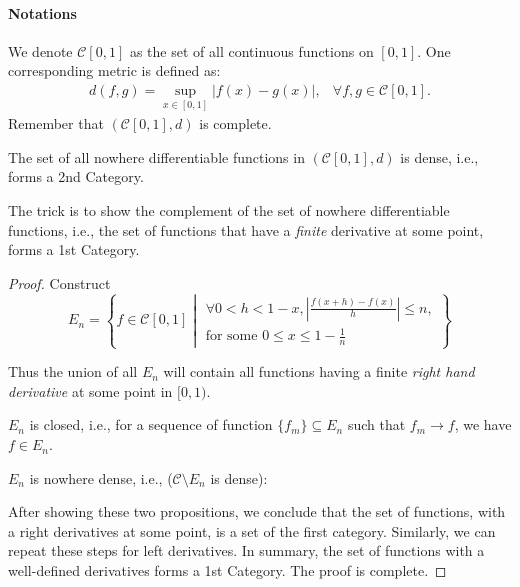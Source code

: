 \paragraph{Notations} We denote $\mathcal{C}[0,1]$ as the set of all continuous functions on $[0,1]$. One corresponding metric is defined as:
\[
\begin{array}{ll}
d(f,g) =\sup_{x\in[0,1]}|f(x) - g(x)|,
&
\forall f,g\in\mathcal{C}[0,1].
\end{array}
\]
Remember that $(\mathcal{C}[0,1],d)$ is complete.

\begin{theorem}
The set of all nowhere differentiable functions in $(\mathcal{C}[0,1],d)$ is dense, i.e., forms a 2nd Category.
\end{theorem}
The trick is to show the complement of the set of nowhere differentiable functions, i.e., the set of functions that have a \emph{finite} derivative at some point, forms a 1st Category.
\begin{proof}
Construct
\[
E_n=\left\{f\in\mathcal{C}[0,1]\middle|
\begin{aligned}
\forall 0<h<1-x,\left|\frac{f(x+h) - f(x)}{h}\right|\le n, \\
\mbox{for some $0\le x\le1-\frac{1}{n}$}
\end{aligned}
\right\}
\]

Thus the union of all $E_n$ will contain all functions having a finite \emph{right hand derivative} at some point in $[0,1).$
\begin{proposition}\label{Pro:4:3}
$E_n$ is closed, i.e., for a sequence of function $\{f_m\}\subseteq E_n$ such that $f_m\to f$, we have  $f\in E_n$.
\end{proposition}
\begin{proposition}\label{Pro:4:4}
$E_n$ is nowhere dense, i.e., ($\mathcal{C}\setminus E_n$ is dense):
\end{proposition}
After showing these two propositions, we conclude that the set of functions, with a right derivatives at some point, is a set of the first category. Similarly, we can repeat these steps for left derivatives. In summary, the set of functions with a well-defined derivatives forms a 1st Category. The proof is complete.
\end{proof}
